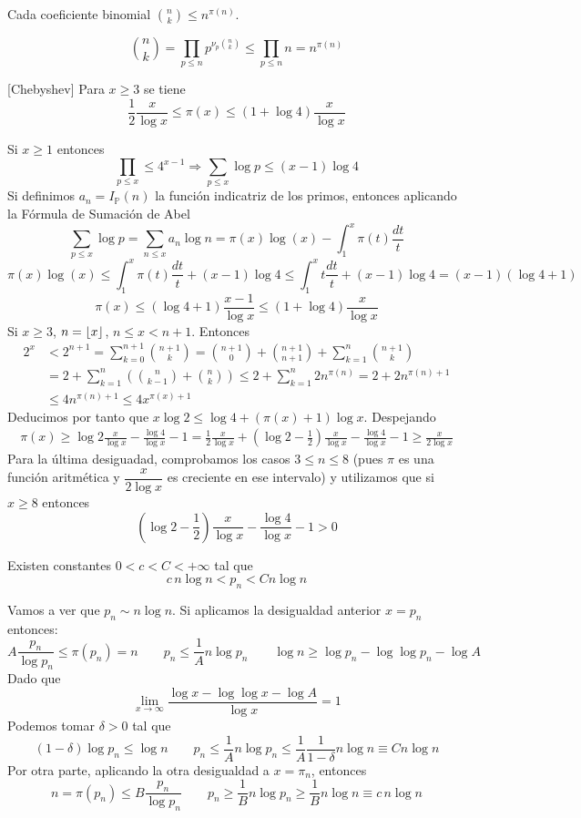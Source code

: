 \documentclass[TAN.tex]{subfiles}
\begin{document}
\begin{coro}
Cada coeficiente binomial $\binom{n}{k} ≤ n^{π(n)}$.
\end{coro}
\begin{dem}
\[ \binom{n}{k} = \prod_{p≤n} p^{\nu_p\binom{n}{k}} ≤ \prod_{p≤n} n = n^{π(n)} \]
\end{dem}
\begin{teorema}\label{th:1.2.6}[Chebyshev] Para $x\geq 3$ se tiene
$$
\frac{1}{2}\frac{x}{\log x}\leq \pi(x)\leq (1+\log 4)\frac{x}{\log x}
$$
\end{teorema}
\begin{dem}
Si $x\geq 1$ entonces 
$$\prod_{p\leq x}\leq 4^{x-1} \Rightarrow \sum_{p\leq x} \log p \leq (x-1) \log 4$$
Si definimos $a_n=I_{\mathbb{P}}(n)$ la función indicatriz de los primos, entonces aplicando la Fórmula de Sumación de Abel
$$\sum_{p\leq x} \log p = \sum_{n\leq x}a_n \log n = \pi(x)\log(x)-\int_1^x \pi(t)\frac{dt}{t}$$
$$\pi(x)\log(x) \leq \int_1^x \pi(t)\frac{dt}{t} + (x-1)\log 4
\leq \int_1^x t\frac{dt}{t} + (x-1)\log4 = (x-1)(\log4 +1)$$
$$ \pi(x)\leq (\log 4 +1) \frac{x-1}{\log x}\leq (1+\log 4)\frac{x}{\log x}$$
Si $x\geq 3$, $n=\left\lfloor{ x }\right\rfloor$, $n\leq x < n+1$. Entonces
\begin{align*}
2^x &< 2^{n+1} = \sum_{k=0}^{n+1}\binom{n+1}{k} = \binom{n+1}{0}+\binom{n+1}{n+1} + \sum_{k=1}^n \binom{n+1}{k}\\
&= 2 +  \sum_{k=1}^n \left(\binom{n}{k-1}+\binom{n}{k}\right) \leq 2 + \sum_{k=1}^n 2n^{\pi(n)} = 2+2n^{\pi(n)+1} \\
&\leq 4n^{\pi(n)+1}\leq 4x^{\pi(x)+1}
\end{align*}
Deducimos por tanto que $x \log 2\leq \log 4 + (\pi(x)+1)\log x$. Despejando	
\begin{align*}
 \pi(x) \geq \log 2 \frac{x}{\log x} -\frac{\log 4}{\log x}-1 = \frac{1}{2}\frac{x}{\log x} +  \left(\log 2 - \frac{1}{2}\right)\frac{x}{\log x} - \frac{\log4}{\log x}-1 \geq \frac{x}{2\log{x}}
\end{align*}
Para la última desiguadad, comprobamos los casos $3\leq n \leq 8$ (pues $\pi$ es una función aritmética y $\dfrac{x}{2\log{x}}$ es creciente en ese intervalo) y utilizamos que si $x\geq 8$ entonces
$$
 \left(\log 2 - \frac{1}{2}\right)\frac{x}{\log x} - \frac{\log4}{\log x}-1 > 0
$$
\end{dem}
\begin{coro}
Existen constantes $0<c<C<+∞$ tal que
\[{c}\,{n} \log n < p_n < C n \log n \]
\end{coro}
\begin{dem}
Vamos a ver que $p_n \sim n \log n$. Si aplicamos la desigualdad anterior $x=p_n$ entonces:
$$
A\frac{p_n}{\log p_n} \leq \pi(p_n) = n \qquad  p_n \leq \frac{1}{A}n\log p_n \qquad \log n \geq \log p_n - \log \log p_n - \log A
$$
Dado que
$$
\lim_{x\to\infty}\frac{\log x-\log\log x-\log A}{\log x}= 1
$$
Podemos tomar $\delta >0$ tal que
$$
(1-\delta)\log p_n \leq \log n \qquad p_n \leq \frac{1}{A}n\log p_n\leq \frac{1}{A}\frac{1}{1-\delta}n \log n\equiv C n \log n$$
Por otra parte, aplicando la otra desigualdad a $x=\pi_n$, entonces
$$n=\pi(p_n) \leq B \dfrac{p_n}{\log p_n} \qquad p_n \geq \frac{1}{B}n\log p_n \geq \frac{1}{B}n \log n\equiv c\,n\log n$$
\end{dem}
\end{document}
